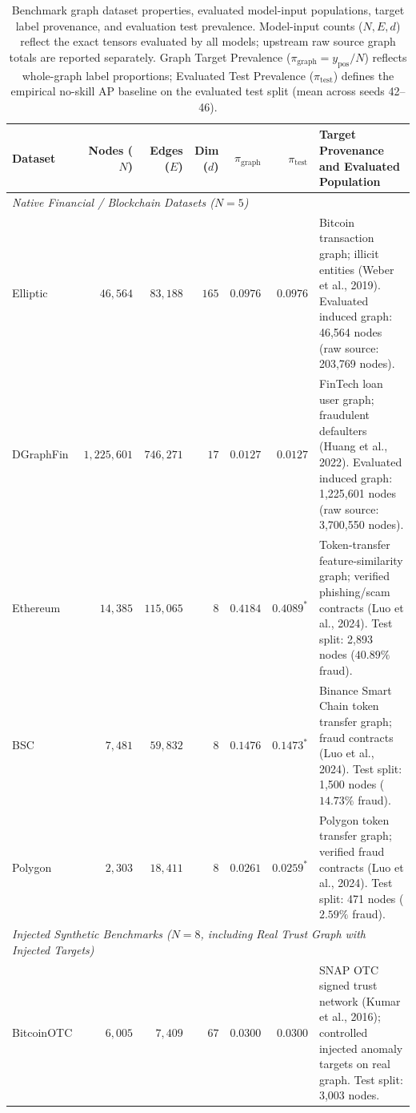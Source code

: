 \documentclass[applsci,article,submit,moreauthors,pdftex]{Definitions/mdpi}
\begin{document}
\begin{table}[htbp]
\centering\fontsize{7.5pt}{8.8pt}\selectfont\setlength{\tabcolsep}{2.5pt}
\caption{Benchmark graph dataset properties, evaluated model-input populations, target label provenance, and evaluation test prevalence. Model-input counts ($N, E, d$) reflect the exact tensors evaluated by all models; upstream raw source graph totals are reported separately. Graph Target Prevalence ($\pi_{\mathrm{graph}} = y_{\mathrm{pos}} / N$) reflects whole-graph label proportions; Evaluated Test Prevalence ($\pi_{\mathrm{test}}$) defines the empirical no-skill AP baseline on the evaluated test split (mean across seeds 42--46).}
\label{tab:dataset_properties}
\begin{tabularx}{\textwidth}{lrrrrr>{\raggedright\arraybackslash}X}\toprule
\textbf{Dataset} & \textbf{Nodes ($N$)} & \textbf{Edges ($E$)} & \textbf{Dim ($d$)} & $\pi_{\mathrm{graph}}$ & $\pi_{\mathrm{test}}$ & \textbf{Target Provenance and Evaluated Population} \\\midrule
\multicolumn{7}{l}{\textit{Native Financial / Blockchain Datasets ($N=5$)}} \\
Elliptic & $46,564$ & $83,188$ & $165$ & $0.0976$ & $0.0976$ & Bitcoin transaction graph; illicit entities (Weber et al., 2019). Evaluated induced graph: 46,564 nodes (raw source: 203,769 nodes). \\
DGraphFin & $1,225,601$ & $746,271$ & $17$ & $0.0127$ & $0.0127$ & FinTech loan user graph; fraudulent defaulters (Huang et al., 2022). Evaluated induced graph: 1,225,601 nodes (raw source: 3,700,550 nodes). \\
Ethereum & $14,385$ & $115,065$ & $8$ & $0.4184$ & $0.4089^*$ & Token-transfer feature-similarity graph; verified phishing/scam contracts (Luo et al., 2024). Test split: 2,893 nodes ($40.89\%$ fraud). \\
BSC & $7,481$ & $59,832$ & $8$ & $0.1476$ & $0.1473^*$ & Binance Smart Chain token transfer graph; fraud contracts (Luo et al., 2024). Test split: 1,500 nodes ($14.73\%$ fraud). \\
Polygon & $2,303$ & $18,411$ & $8$ & $0.0261$ & $0.0259^*$ & Polygon token transfer graph; verified fraud contracts (Luo et al., 2024). Test split: 471 nodes ($2.59\%$ fraud). \\
\midrule
\multicolumn{7}{l}{\textit{Injected Synthetic Benchmarks ($N=8$, including Real Trust Graph with Injected Targets)}} \\
BitcoinOTC & $6,005$ & $7,409$ & $67$ & $0.0300$ & $0.0300$ & SNAP OTC signed trust network (Kumar et al., 2016); controlled injected anomaly targets on real graph. Test split: 3,003 nodes. \\

\end{tabularx}
\end{table}
\end{document}
